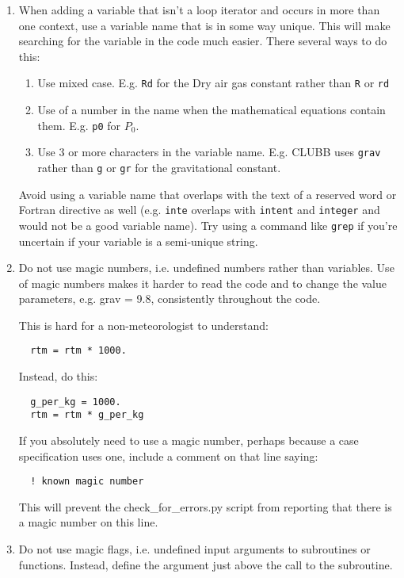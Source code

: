 \documentclass[letterpaper,12pt]{article}
\begin{document}
\begin{enumerate}
\item When adding a variable that isn't a loop iterator and occurs in more 
than one context, use a variable name that is in some way unique. 
This will make searching for the variable in the code much easier. 
There several ways to do this:
	\begin{enumerate}
	\item Use mixed case.  E.g. \texttt{Rd} for the Dry air gas constant 
	rather than \texttt{R} or \texttt{rd}
	\item Use of a number in the name when the mathematical equations 
	contain them. 
	 E.g. \texttt{p0} for $P_0$.
	\item Use 3 or more characters in the variable name.
	E.g. CLUBB uses \texttt{grav} 
	rather than \texttt{g} or \texttt{gr} for the gravitational constant.
	\end{enumerate}
Avoid using a variable name that overlaps with the text of a reserved word or
Fortran directive as well (e.g. \texttt{inte} overlaps with \texttt{intent} 
and \texttt{integer} and would not be a good variable name).
Try using a command
like \texttt{grep} if you're uncertain if your variable is a semi-unique string.
\newline

\item  Do not use magic numbers, i.e. undefined numbers rather than variables.
Use of magic numbers makes it harder to read the code and to change the value 
parameters, e.g. grav = 9.8, consistently throughout the code.

This is hard for a non-meteorologist to understand: 
\begin{verbatim}
  rtm = rtm * 1000. 
\end{verbatim}

Instead, do this:
\begin{verbatim}
  g_per_kg = 1000.
  rtm = rtm * g_per_kg
\end{verbatim}

If you absolutely need to use a magic number, perhaps because a case 
specification uses one, include a comment on that line saying:
\begin{verbatim}
  ! known magic number
\end{verbatim}
This will prevent the check\_for\_errors.py script from reporting that there is a 
magic number on this line.

\item  Do not use magic flags, i.e. undefined input arguments to subroutines or 
functions.  Instead, define the argument just above the call to the subroutine.


\end{enumerate}
\end{document}
